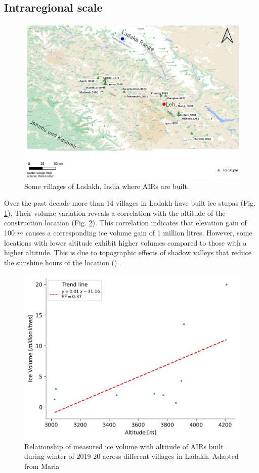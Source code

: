 \subsection{Intraregional scale}

\begin{figure}[htb]
	\includegraphics[width=\textwidth]{figs/ISC_villages}
  \caption{Some villages of Ladakh, India where AIRs are built.}
	\label{fig:villages}
\end{figure}

Over the past decade more than 14 villages in Ladakh have built ice stupas (Fig. \ref{fig:villages}). Their
volume variation reveals a correlation with the altitude of the construction location (Fig. \ref{fig:altvsvol}).
This correlation indicates that elevation gain of 100 $m$ causes a corresponding ice volume gain of 1 million
litres. However, some locations with lower altitude exhibit higher volumes compared to those with a higher
altitude. This is due to topographic effects of shadow valleys that reduce the sunshine hours of the location
(\cite{Maria}).

\begin{figure}[htb]
\centering
\includegraphics[width=\textwidth]{figs/altitudevsvolume.png}
\caption{Relationship of measured ice volume with altitude of AIRs built during winter of 2019-20 across
different villages in Ladakh. Adapted from Maria  }
\label{fig:altvsvol}
\end{figure}

